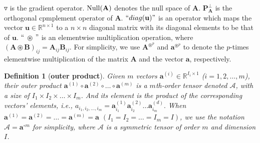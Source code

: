 \documentclass{elsarticle}
\newtheorem{definition}{\textbf{Definition} }
\begin{document}
$\triangledown$ is  the  gradient  operator.
$ \rm Null( \mathbf A) $ 
denotes the null space  of $\mathbf A$. 
$ \mathbf  P_{\mathbf  A }^{\bot} $ is  the  orthogonal   cpmplement  operator  of  $\mathbf A$.
$``diag(\mathbf u)" $ is an operator which maps the vector  $  \mathbf u  \in  \mathbb R^{n \times 1} $   to 
a $ n \times n $ 
diagonal matrix with its  diagonal  elements to be that of $  \mathbf u$.
$``$ $\circledast$ $"$ is an  elementwise   multiplication  operation, where $   (\mathbf  {A} \circledast  \mathbf  {B})_{ij} =
\mathbf  A_{ij}\mathbf  B_{ij}$.
  For simplicity,  we use
$ \mathbf A ^{\circledast^{p}}$
and
$ \mathbf a ^{\circledast^{p}}$
to denote the $p$-times  elementwise   multiplication  of the matrix
$ \mathbf A  $ and the vector $ \mathbf a $,  respectively.


\begin{definition}[\textbf{outer product}]
	\label{outerprod}
	Given   $m$  vectors 
	$ \mathbf a^{(i) } \in \mathbb {R}^{I_i \times 1}$ 
	($i=1,2, \dots, m$),
	their   outer  product   
	$ \mathbf a^{(1) }
	\circ
	\mathbf a^{(2) }
	\circ  \dots
	\circ
	\mathbf a^{(m) } 
	$  
	is   a    $ m$th-order  tensor denoted $   \mathcal A$,  with  a size  of  
	$ I_1 \times I_2  \times \dots \times I_m  $.  
	And  its    element is    the  product  of    the  corresponding  vectors'   elements, i.e., 
	$ 
	a_{i_1,i_2,\dots,i_m}
	= 
	\mathbf a^{(1) }_{i_1}
	\mathbf a^{(2) }_{i_2}
	\dots
	\mathbf a^{(d) }_{i_m} 
	.
	$
	When 
	$  \mathbf a^{(1) }
	=  
	\mathbf a^{(2) }
	=   \dots
	= 
	\mathbf a^{(m) }
	=\mathbf a $ $(I_1 =  I_2  = \dots = I_m =I)$,  we use  the  notation 
	$ \mathcal A =  \mathbf a^{\circ m}$  for  simplicity,  where 
	$   \mathcal A $ is  a  symmetric  tensor  of  order  $m$  and  dimension  $ I$.  
\end{definition}
\end{document}
